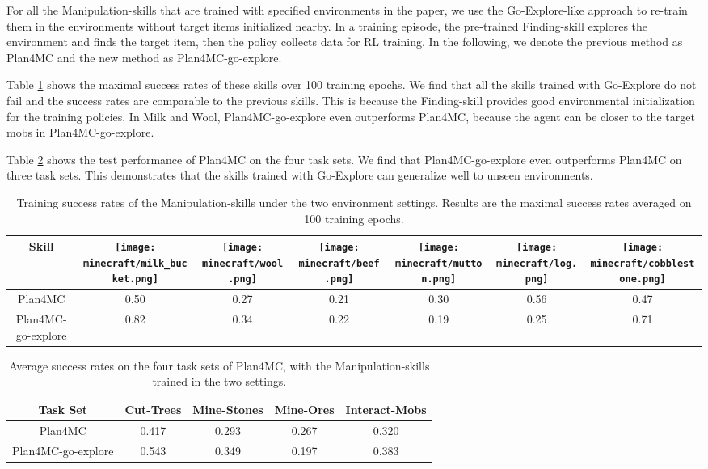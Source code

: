 \documentclass{article}
\newcommand{\mcbeef}{\texttt{[image: minecraft/beef.png]}}
\newcommand{\mccobblestone}{\texttt{[image: minecraft/cobblestone.png]}}
\newcommand{\mclog}{\texttt{[image: minecraft/log.png]}}
\newcommand{\mcmilkbucket}{\texttt{[image: minecraft/milk\_bucket.png]}}
\newcommand{\mcmutton}{\texttt{[image: minecraft/mutton.png]}}
\newcommand{\mcwool}{\texttt{[image: minecraft/wool.png]}}
\begin{document}
For all the Manipulation-skills that are trained with specified environments in the paper, we use the Go-Explore-like approach to re-train them in the environments without target items initialized nearby. 
In a training episode, the pre-trained Finding-skill explores the environment and finds the target item, then the policy collects data for RL training. In the following, we denote the previous method as Plan4MC and the new method as Plan4MC-go-explore.

Table \ref{tab:skill-success-go-explore} shows the maximal success rates of these skills over 100 training epochs. We find that all the skills trained with Go-Explore do not fail and the success rates are comparable to the previous skills. This is because the Finding-skill provides good environmental initialization for the training policies. In Milk and Wool, Plan4MC-go-explore even outperforms Plan4MC, because the agent can be closer to the target mobs in Plan4MC-go-explore.

Table \ref{tab:task-success-go-explore} shows the test performance of Plan4MC on the four task sets. We find that Plan4MC-go-explore even outperforms Plan4MC on three task sets. This demonstrates that the skills trained with Go-Explore can generalize well to unseen environments. %

\begin{table}[htbp]
  \caption{Training success rates of the Manipulation-skills under the two environment settings. Results are the maximal success rates averaged on 100 training epochs.}
  \label{tab:skill-success-go-explore}
  \centering
  \begin{tabular}{ccccccc}
    \toprule
    Skill             & \mcmilkbucket & \mcwool & \mcbeef & \mcmutton & \mclog & \mccobblestone \\
    \midrule
    Plan4MC &	0.50 &	0.27 &	0.21 &	0.30 &	0.56 &	0.47 \\
    Plan4MC-go-explore &	0.82 &	0.34 &	0.22 &	0.19 &	0.25 &	0.71 \\
    \bottomrule
  \end{tabular}
\end{table}


\begin{table}[htbp]
  \caption{Average success rates on the four task sets of Plan4MC, with the Manipulation-skills trained in the two settings.}
  \label{tab:task-success-go-explore}
  \centering
  \begin{tabular}{ccccc}
    \toprule
    Task Set &	Cut-Trees &	Mine-Stones &	Mine-Ores &	Interact-Mobs \\
    \midrule
    Plan4MC &	0.417 &	0.293 &	0.267 &	0.320 \\
    Plan4MC-go-explore &	0.543 &	0.349 &	0.197 &	0.383 \\
    \bottomrule
  \end{tabular}
\end{table}
\end{document}
